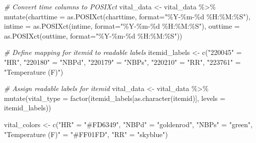 \documentclass[
]{article}
\newenvironment{Shaded}{\begin{snugshade}}{\end{snugshade}}
\newcommand{\AttributeTok}[1]{\textcolor[rgb]{0.77,0.63,0.00}{#1}}
\newcommand{\CommentTok}[1]{\textcolor[rgb]{0.56,0.35,0.01}{\textit{#1}}}
\newcommand{\FunctionTok}[1]{\textcolor[rgb]{0.00,0.00,0.00}{#1}}
\newcommand{\NormalTok}[1]{\textcolor[rgb]{0.00,0.00,0.00}{#1}}
\newcommand{\OtherTok}[1]{\textcolor[rgb]{0.56,0.35,0.01}{#1}}
\newcommand{\SpecialCharTok}[1]{\textcolor[rgb]{0.00,0.00,0.00}{#1}}
\newcommand{\StringTok}[1]{\textcolor[rgb]{0.31,0.60,0.02}{#1}}
\begin{document}
\begin{Shaded}
\begin{Highlighting}[]
\CommentTok{\# Convert time columns to POSIXct}
\NormalTok{vital\_data }\OtherTok{\textless{}{-}}\NormalTok{ vital\_data }\SpecialCharTok{\%\textgreater{}\%}
  \FunctionTok{mutate}\NormalTok{(}\AttributeTok{charttime =} \FunctionTok{as.POSIXct}\NormalTok{(charttime, }\AttributeTok{format=}\StringTok{"\%Y{-}\%m{-}\%d \%H:\%M:\%S"}\NormalTok{),}
         \AttributeTok{intime =} \FunctionTok{as.POSIXct}\NormalTok{(intime, }\AttributeTok{format=}\StringTok{"\%Y{-}\%m{-}\%d \%H:\%M:\%S"}\NormalTok{),}
         \AttributeTok{outtime =} \FunctionTok{as.POSIXct}\NormalTok{(outtime, }\AttributeTok{format=}\StringTok{"\%Y{-}\%m{-}\%d \%H:\%M:\%S"}\NormalTok{))}
  

\CommentTok{\# Define mapping for itemid to readable labels}
\NormalTok{itemid\_labels }\OtherTok{\textless{}{-}} \FunctionTok{c}\NormalTok{(}\StringTok{"220045"} \OtherTok{=} \StringTok{"HR"}\NormalTok{,}
                   \StringTok{"220180"} \OtherTok{=} \StringTok{"NBPd"}\NormalTok{,}
                   \StringTok{"220179"} \OtherTok{=} \StringTok{"NBPs"}\NormalTok{,}
                   \StringTok{"220210"} \OtherTok{=} \StringTok{"RR"}\NormalTok{,}
                   \StringTok{"223761"} \OtherTok{=} \StringTok{"Temperature (F)"}\NormalTok{)}

\CommentTok{\# Assign readable labels for itemid}
\NormalTok{vital\_data }\OtherTok{\textless{}{-}}\NormalTok{ vital\_data }\SpecialCharTok{\%\textgreater{}\%}
  \FunctionTok{mutate}\NormalTok{(}\AttributeTok{vital\_type =} \FunctionTok{factor}\NormalTok{(itemid\_labels[}\FunctionTok{as.character}\NormalTok{(itemid)], }
                             \AttributeTok{levels =}\NormalTok{ itemid\_labels))}

\NormalTok{vital\_colors }\OtherTok{\textless{}{-}} \FunctionTok{c}\NormalTok{(}\StringTok{"HR"} \OtherTok{=} \StringTok{"\#FD6349"}\NormalTok{, }
                  \StringTok{"NBPd"} \OtherTok{=} \StringTok{"goldenrod"}\NormalTok{, }
                  \StringTok{"NBPs"} \OtherTok{=} \StringTok{"green"}\NormalTok{, }
                  \StringTok{"Temperature (F)"} \OtherTok{=} \StringTok{"\#FF01FD"}\NormalTok{, }
                  \StringTok{"RR"} \OtherTok{=} \StringTok{"skyblue"}\NormalTok{)}
\end{Highlighting}
\end{Shaded}
\end{document}

